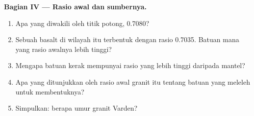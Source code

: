 \begin{problem}
\medskip
\noindent\textbf{Bagian IV --- Rasio awal dan sumbernya.}
\begin{enumerate}[resume]
  \item Apa yang diwakili oleh titik potong, 0.7080?
  \item Sebuah basalt di wilayah itu terbentuk dengan rasio 0.7035. Batuan
        mana yang rasio awalnya lebih tinggi?
  \item Mengapa batuan kerak mempunyai rasio yang lebih tinggi daripada mantel?
  \item Apa yang ditunjukkan oleh rasio awal granit itu tentang batuan yang
        meleleh untuk membentuknya?
  \item Simpulkan: berapa umur granit Varden?
\end{enumerate}
\end{problem}
